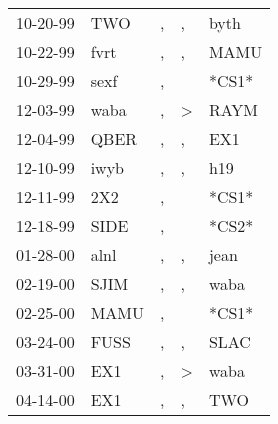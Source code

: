 \begin{supertabular}{p{0.07\textwidth}p{0.06\textwidth}p{0.02\textwidth}p{0.02\textwidth}p{0.06\textwidth}}
          10-20-99\textsuperscript{} &            TWO\textsuperscript{} &                , &                , &           byth\textsuperscript{} \\
          10-22-99\textsuperscript{} &           fvrt\textsuperscript{} &                , &                , &           MAMU\textsuperscript{} \\
          10-29-99\textsuperscript{} &           sexf\textsuperscript{} &                , &                  &                            *CS1* \\
          12-03-99\textsuperscript{} &           waba\textsuperscript{} &                , &     \textgreater &           RAYM\textsuperscript{} \\
          12-04-99\textsuperscript{} &           QBER\textsuperscript{} &                , &                , &            EX1\textsuperscript{} \\
          12-10-99\textsuperscript{} &           iwyb\textsuperscript{} &                , &                , &            h19\textsuperscript{} \\
          12-11-99\textsuperscript{} &            2X2\textsuperscript{} &                , &                  &                            *CS1* \\
          12-18-99\textsuperscript{} &           SIDE\textsuperscript{} &                , &                  &                            *CS2* \\
          01-28-00\textsuperscript{} &           alnl\textsuperscript{} &                , &                , &           jean\textsuperscript{} \\
          02-19-00\textsuperscript{} &           SJIM\textsuperscript{} &                , &                , &           waba\textsuperscript{} \\
          02-25-00\textsuperscript{} &           MAMU\textsuperscript{} &                , &                  &                            *CS1* \\
          03-24-00\textsuperscript{} &           FUSS\textsuperscript{} &                , &                , &           SLAC\textsuperscript{} \\
          03-31-00\textsuperscript{} &            EX1\textsuperscript{} &                , &     \textgreater &           waba\textsuperscript{} \\
          04-14-00\textsuperscript{} &            EX1\textsuperscript{} &                , &                , &            TWO\textsuperscript{} \\

\end{supertabular}
